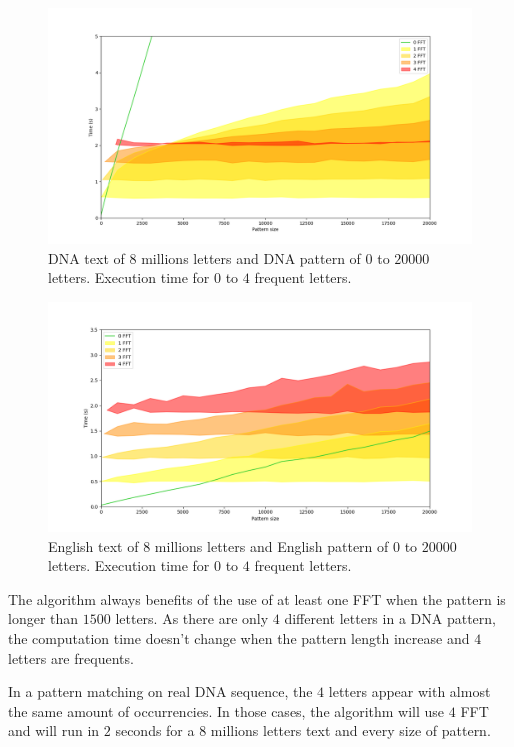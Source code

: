 \documentclass[preprint,12pt]{elsarticle}
\begin{document}
\begin{figure}[h]
\includegraphics[scale=0.45]{./figures/ExHDADN.png}
\caption{DNA text of $8$ millions letters and DNA pattern of $0$ to $20 000$ letters.
Execution time for $0$ to $4$ frequent letters.}
\label{ExHDADN}
\end{figure}

\begin{figure}[h]
\includegraphics[scale=0.45]{./figures/ExHDEnglish.png}
\caption{English text of $8$ millions letters and English pattern of $0$ to $20 000$ letters.
Execution time for $0$ to $4$ frequent letters.}
\label{ExHDEnglish}
\end{figure}


The algorithm always benefits of the use of at least one FFT when the pattern is longer than $1500$ letters.
As there are only $4$ different letters in a DNA pattern,
the computation time doesn't change when the pattern length increase and $4$ letters are frequents.

In a pattern matching on real DNA sequence, the $4$ letters appear with almost the same amount of occurrencies.
In those cases,
the algorithm will use $4$ FFT and will run in $2$ seconds
for a $8$ millions letters text and every size of pattern.
\end{document}
